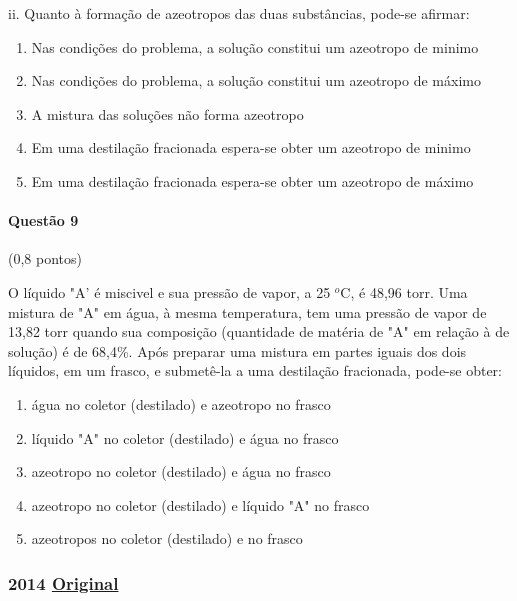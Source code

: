 \documentclass[12pt,a4paper]{article}
\newcommand{\original}[1]{\tiny \href{#1}{Original} \normalsize}
\begin{document}
ii. Quanto à formação de azeotropos das duas substâncias, pode-se afirmar:

\begin{enumerate}[label=\alph*)]

\item Nas condições do problema, a solução constitui um azeotropo de minimo

\item Nas condições do problema, a solução constitui um azeotropo de máximo

\item A mistura das soluções não forma azeotropo

\item Em uma destilação fracionada espera-se obter um azeotropo de minimo

\item Em uma destilação fracionada espera-se obter um azeotropo de máximo

\end{enumerate}

\paragraph{Questão 9} (0,8 pontos)

O líquido "A' é miscivel e sua pressão de vapor, a 25 $^o$C, é 48,96 torr. Uma mistura de "A" em água, à mesma temperatura, tem uma pressão de vapor de 13,82 torr quando sua composição (quantidade de matéria de "A" em relação à de solução) é de 68,4\%. Após preparar uma mistura em partes iguais dos dois líquidos, em um frasco, e submetê-la a uma destilação fracionada, pode-se obter:

\begin{enumerate}[label=\alph*)]
\item água no coletor (destilado) e azeotropo no frasco
\item líquido "A" no coletor (destilado) e água no frasco
\item azeotropo no coletor (destilado) e água no frasco
\item azeotropo no coletor (destilado) e líquido "A" no frasco
\item azeotropos no coletor (destilado) e no frasco
\end{enumerate}

\newpage

\subsubsection{2014 \original{https://drive.google.com/file/d/1l8_Pa1kKV8Q-k-rtxUD8GLd-Z16cAdco/view?usp=sharing}}
\end{document}
